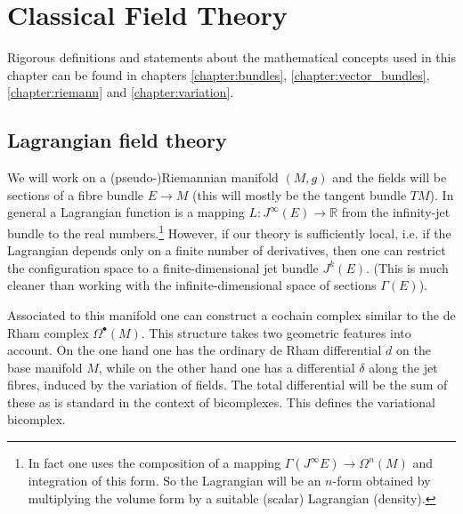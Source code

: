 \chapter{Classical Field Theory}\label{chapter:classical_fields}

    Rigorous definitions and statements about the mathematical concepts used in this chapter can be found in chapters \ref{chapter:bundles}, \ref{chapter:vector_bundles}, \ref{chapter:riemann} and \ref{chapter:variation}.

\section{Lagrangian field theory}

    We will work on a (pseudo-)Riemannian manifold $(M, g)$ and the fields will be sections of a fibre bundle $E\rightarrow M$ (this will mostly be the tangent bundle $TM$). In general a Lagrangian function is a mapping $L:J^\infty(E)\rightarrow\mathbb{R}$ from the infinity-jet bundle to the real numbers.\footnote{In fact one uses the composition of a mapping $\Gamma(J^\infty E)\rightarrow\Omega^n(M)$ and integration of this form. So the Lagrangian will be an $n$-form obtained by multiplying the volume form by a suitable (scalar) Lagrangian (density).} However, if our theory is sufficiently local, i.e. if the Lagrangian depends only on a finite number of derivatives, then one can restrict the configuration space to a finite-dimensional jet bundle $J^k(E)$. (This is much cleaner than working with the infinite-dimensional space of sections $\Gamma(E)$).

    Associated to this manifold one can construct a cochain complex similar to the de Rham complex $\Omega^\bullet(M)$. This structure takes two geometric features into account. On the one hand one has the ordinary de Rham differential $d$ on the base manifold $M$, while on the other hand one has a differential $\delta$ along the jet fibres, induced by the variation of fields. The total differential will be the sum of these as is standard in the context of bicomplexes. This defines the variational bicomplex.

